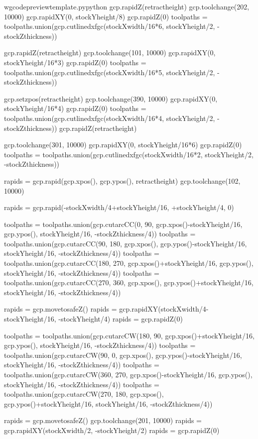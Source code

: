 \documentclass{ltxdoc}
\begin{document}
\begin{writecode}{w}{gcodepreviewtemplate.py}{python}
gcp.rapidZ(retractheight)
gcp.toolchange(202, 10000)
gcp.rapidXY(0, stockYheight/8)
gcp.rapidZ(0)
toolpaths = toolpaths.union(gcp.cutlinedxfgc(stockXwidth/16*6, stockYheight/2, -stockZthickness))

gcp.rapidZ(retractheight)
gcp.toolchange(101, 10000)
gcp.rapidXY(0, stockYheight/16*3)
gcp.rapidZ(0)
toolpaths = toolpaths.union(gcp.cutlinedxfgc(stockXwidth/16*5, stockYheight/2, -stockZthickness))

gcp.setzpos(retractheight)
gcp.toolchange(390, 10000)
gcp.rapidXY(0, stockYheight/16*4)
gcp.rapidZ(0)
toolpaths = toolpaths.union(gcp.cutlinedxfgc(stockXwidth/16*4, stockYheight/2, -stockZthickness))
gcp.rapidZ(retractheight)

gcp.toolchange(301, 10000)
gcp.rapidXY(0, stockYheight/16*6)
gcp.rapidZ(0)
toolpaths = toolpaths.union(gcp.cutlinedxfgc(stockXwidth/16*2, stockYheight/2, -stockZthickness))

rapids = gcp.rapid(gcp.xpos(), gcp.ypos(), retractheight)
gcp.toolchange(102, 10000)

rapids = gcp.rapid(-stockXwidth/4+stockYheight/16, +stockYheight/4, 0)

toolpaths = toolpaths.union(gcp.cutarcCC(0, 90, gcp.xpos()-stockYheight/16, gcp.ypos(), stockYheight/16, -stockZthickness/4))
toolpaths = toolpaths.union(gcp.cutarcCC(90, 180, gcp.xpos(), gcp.ypos()-stockYheight/16, stockYheight/16, -stockZthickness/4))
toolpaths = toolpaths.union(gcp.cutarcCC(180, 270, gcp.xpos()+stockYheight/16, gcp.ypos(), stockYheight/16, -stockZthickness/4))
toolpaths = toolpaths.union(gcp.cutarcCC(270, 360, gcp.xpos(), gcp.ypos()+stockYheight/16, stockYheight/16, -stockZthickness/4))

rapids = gcp.movetosafeZ()
rapids = gcp.rapidXY(stockXwidth/4-stockYheight/16, -stockYheight/4)
rapids = gcp.rapidZ(0)

toolpaths = toolpaths.union(gcp.cutarcCW(180, 90, gcp.xpos()+stockYheight/16, gcp.ypos(), stockYheight/16, -stockZthickness/4))
toolpaths = toolpaths.union(gcp.cutarcCW(90, 0, gcp.xpos(), gcp.ypos()-stockYheight/16, stockYheight/16, -stockZthickness/4))
toolpaths = toolpaths.union(gcp.cutarcCW(360, 270, gcp.xpos()-stockYheight/16, gcp.ypos(), stockYheight/16, -stockZthickness/4))
toolpaths = toolpaths.union(gcp.cutarcCW(270, 180, gcp.xpos(), gcp.ypos()+stockYheight/16, stockYheight/16, -stockZthickness/4))

rapids = gcp.movetosafeZ()
gcp.toolchange(201, 10000)
rapids = gcp.rapidXY(stockXwidth/2, -stockYheight/2)
rapids = gcp.rapidZ(0)


\end{writecode}
\end{document}
